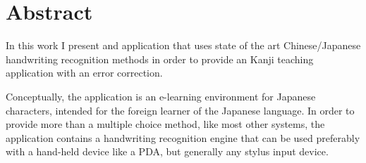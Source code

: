 
\section{Abstract}

  



    



In this work I present and application that uses state of the art 
Chinese/Japanese handwriting recognition methods in order to provide 
an Kanji teaching application with an error correction.

Conceptually, the application is an e-learning environment for Japanese 
characters, intended for the foreign learner of the Japanese language. 
In order to provide more than a  multiple choice method, like most other 
systems, the application contains a handwriting recognition engine that can
be used preferably with a hand-held device like a PDA, but generally any 
stylus input device.

